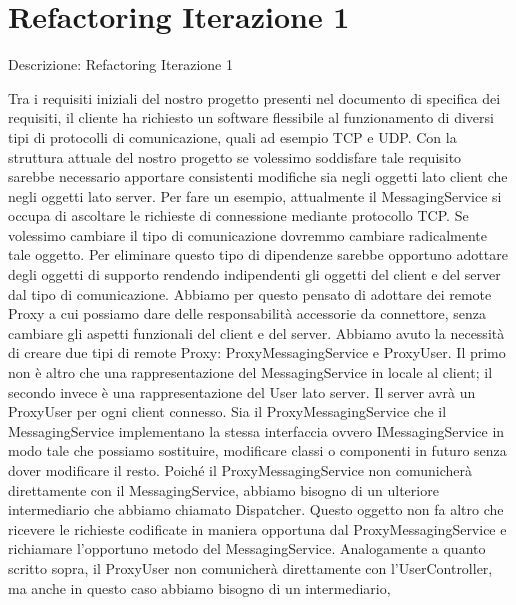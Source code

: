 \section{Refactoring Iterazione 1}
\begin{frame}[allowframebreaks] {Descrizione: Refactoring Iterazione 1}
 \begin{scriptsize}
   Tra i requisiti iniziali del nostro progetto presenti nel documento di specifica dei requisiti, il cliente ha richiesto un software flessibile al funzionamento di 
   diversi tipi di protocolli di comunicazione, quali ad esempio TCP e UDP. Con la struttura attuale del nostro progetto se volessimo soddisfare tale requisito 
   sarebbe necessario apportare consistenti modifiche sia negli oggetti lato client che negli oggetti lato server. Per fare un esempio, attualmente il 
   MessagingService si occupa di ascoltare le richieste di connessione mediante protocollo TCP. Se volessimo cambiare il tipo di comunicazione dovremmo cambiare 
   radicalmente tale oggetto. Per eliminare questo tipo di dipendenze sarebbe opportuno adottare degli oggetti di supporto rendendo indipendenti gli oggetti del 
   client e del server dal tipo di comunicazione. Abbiamo per questo pensato di adottare dei remote Proxy a cui possiamo dare delle responsabilità accessorie da 
   connettore, senza cambiare gli aspetti funzionali del client e del server.
   \newline
   \newline
   Abbiamo avuto la necessità di creare due tipi di remote Proxy:
   \newline
   ProxyMessagingService e ProxyUser. Il primo non è altro che una rappresentazione del MessagingService in locale al client; il secondo invece è una 	
   rappresentazione del User lato server. Il server avrà un ProxyUser per ogni client connesso. Sia il ProxyMessagingService che il MessagingService implementano la  
   stessa interfaccia ovvero IMessagingService in modo tale che possiamo sostituire, modificare classi o componenti in futuro senza dover modificare il resto.
   Poiché il ProxyMessagingService non comunicherà direttamente con il MessagingService, abbiamo bisogno di un ulteriore intermediario che abbiamo chiamato 
   Dispatcher. Questo oggetto non fa altro che ricevere le richieste codificate in maniera opportuna dal ProxyMessagingService e richiamare l'opportuno metodo del 
   MessagingService.
   \newline
   Analogamente a quanto scritto sopra, il ProxyUser non comunicherà direttamente con l'UserController, ma anche in questo caso abbiamo bisogno di un intermediario, 

\end{scriptsize}
\end{frame}
